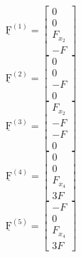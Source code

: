 \documentclass[12pt,a4paper]{article}
\def\vec#1{\underline{\mathrm{#1}}}
\begin{document}
\begin{multicols}{7}
    \noindent
    \begin{equation*}
        \vec{F}^{\left(1\right)}=
        \begin{bmatrix}
            0       \\
            0       \\
            F_{x_2} \\
            -F
        \end{bmatrix}
    \end{equation*}
    \columnbreak
    \begin{equation*}
        \vec{F}^{\left(2\right)}=
        \begin{bmatrix}
            0  \\
            0  \\
            -F \\
            0
        \end{bmatrix}
    \end{equation*}
    \columnbreak
    \begin{equation*}
        \vec{F}^{\left(3\right)}=
        \begin{bmatrix}
            F_{x_2} \\
            -F      \\
            -F      \\
            0
        \end{bmatrix}
    \end{equation*}
    \columnbreak
    \begin{equation*}
        \vec{F}^{\left(4\right)}=
        \begin{bmatrix}
            0       \\
            0       \\
            F_{x_4} \\
            3 F
        \end{bmatrix}
    \end{equation*}
    \begin{equation*}
        \vec{F}^{\left(5\right)}=
        \begin{bmatrix}
            -F      \\
            0       \\
            F_{x_4} \\
            3 F
        \end{bmatrix}

\end{equation*}
\end{multicols}
\end{document}

